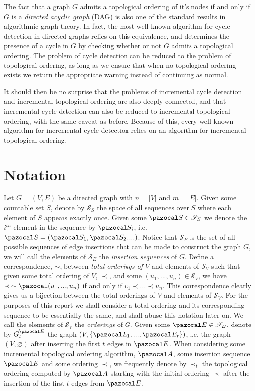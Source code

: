 \documentclass{report}
\begin{document}
The fact that a graph $G$ admits a topological ordering of it's nodes if and only if $G$ is a \textit{directed acyclic graph} (DAG) is also one of the standard results in algorithmic graph theory. In fact, the most well known algorithm for cycle detection in directed graphs relies on this equivalence, and determines the presence of a cycle in $G$ by checking whether or not $G$ admits a topological ordering. The problem of cycle detection can be reduced to the problem of topological ordering, as long as we ensure that when no topological ordering exists we return the appropriate warning instead of continuing as normal.

It should then be no surprise that the problems of incremental cycle detection and incremental topological ordering are also deeply connected, and that incremental cycle detection can also be reduced to incremental topological ordering, with the same caveat as before. Because of this, every well known algorithm for incremental cycle detection relies on an algorithm for incremental topological ordering.

\section{Notation}\label{notation}

Let $G=(V,E)$ be a directed graph with $n=\vert V \vert$ and $m=\vert E \vert$. Given some countable set $S$, denote by $\mathcal{S}_{S}$ the space of all sequences over $S$ where each element of $S$ appears exactly once. Given some $\pazocal S \in \mathcal S_S$ we denote the $i^{th}$ element in the sequence by $\pazocal S_i$, i.e. $\pazocal S = (\pazocal S_1, \pazocal S_2,...)$. Notice that $\mathcal S_E$ is the set of all possible sequences of edge insertions that can be made to construct the graph $G$, we will call the elements of $\mathcal S_E$ the \textit{insertion sequences} of $G$. Define a correspondence, $\sim$, between \textit{total orderings of $V$} and elements of $\mathcal S_V$ such that given some total ordering of $V$, $\prec$, and some $(u_1,...,u_n) \in \mathcal S_V$, we have $\prec \: \sim \pazocal (u_1,...,u_n)$ if and only if $u_1 \prec ... \prec u_n$. This correspondence clearly gives us a bijection between the total orderings of $V$ and elements of $\mathcal S_V$. For the purposes of this report we shall consider a total ordering and its corresponding sequence to be essentially the same, and shall abuse this notation later on. We call the elements of $\mathcal S_V$ the \textit{orderings} of $G$. Given some $\pazocal E \in \mathcal S_E$, denote by $G^{\pazocal E}_t$ the graph $(V, \{\pazocal E_1,..., \pazocal E_t \})$, i.e. the graph $(V, \varnothing)$ after inserting the first $t$ edges in $\pazocal E$. When considering some incremental topological ordering algorithm, $\pazocal A$, some insertion sequence $\pazocal E$ and some ordering $\prec$, we frequently denote by $\prec_t$ the topological ordering computed by $\pazocal A$ starting with the initial ordering $\prec$ after the insertion of the first $t$ edges from $\pazocal E$.
\end{document}
